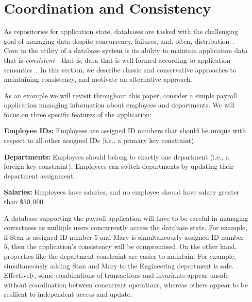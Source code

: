 
\section{Coordination and Consistency}
\label{sec:motivation}


As repositories for application state, databases are tasked with the
challenging goal of managing data despite concurrency, failures, and,
often, distribution~\cite{bernstein-book}. Core to the utility of a
database system is its ability to maintain application data that is
\textit{consistent}---that is, data that is well formed according to
application semantics~\cite{gray-virtues}. In this section, we 
describe classic and conservative approaches to
maintaining consistency, and motivate an alternative approach.

 As an example we will revisit throughout
this paper, consider a simple payroll application managing information
about employees and departments. We will focus on three specific
features of the application:
\begin{myitemize}
\item\textbf{Employee IDs:} Employees are assigned ID numbers that
  should be unique with respect to all other assigned IDs (i.e., a
  primary key constraint).
  \item\textbf{Departments:} Employees should belong to exactly one
  department (i.e., a foreign key constraint). Employees can switch
  departments by updating their department assignment.
\item\textbf{Salaries:} Employees have salaries, and no employee
  should have salary greater than $\$50,000$.
\end{myitemize}
A database supporting the payroll application will have to be careful
in managing correctness as multiple users concurrently access the
database state. For example, if Stan is assigned ID number $5$ and
Mary is simultaneously assigned ID number $5$, then the application's
consistency will be compromised. On the other hand, properties like
the department constraint are easier to maintain. For example,
simultaneously adding Stan and Mary to the Engineering department is
safe. Effectively, some combinations of transactions and invariants
appear unsafe without coordination between concurrent operations,
whereas others appear to be resilient to independent access and
update.

